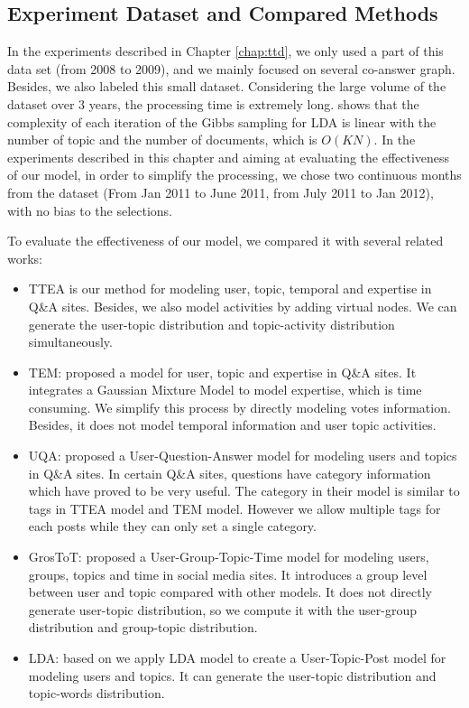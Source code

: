 {{{{{{{\subsection{Experiment Dataset and Compared Methods}
In the experiments described in Chapter \ref{chap:ttd}, we only used a part of this data set (from 2008 to 2009), and we mainly focused on several co-answer graph. Besides, we also labeled this small dataset.
Considering the large volume of the dataset over 3 years, the processing time is extremely long. \cite{chp7ldatimecomplexity} shows that the complexity of each iteration of the Gibbs sampling for LDA is linear with the number of topic and the number of documents, which is $O(KN)$.  
In the experiments described in this chapter and aiming at evaluating the effectiveness of our model, in order to simplify the processing, we chose two continuous months from the dataset (From Jan 2011 to June 2011, from July 2011 to Jan 2012), with no bias to the selections.

To evaluate the effectiveness of our model, we compared it with several related works:  
\begin{itemize}
\item{TTEA} is our method for modeling user, topic, temporal and expertise in Q\&A sites. Besides, we also model activities by adding virtual nodes. We can generate the user-topic distribution and topic-activity distribution simultaneously. 
\item{TEM}: \cite{yang2013cqarank} proposed a model for user, topic and expertise in Q\&A sites. It integrates a Gaussian Mixture Model to model expertise, which is time consuming. We simplify this process by directly modeling votes information. Besides, it does not model temporal information and user topic activities. 
\item{UQA}: \cite{guo2008tapping} proposed a User-Question-Answer model for modeling users and topics in Q\&A  sites. In certain Q\&A  sites, questions have category information which have proved to be very useful. The category in their model is similar to tags in TTEA model and TEM model. However we allow multiple tags for each posts while they can only set a single category.
\item{GrosToT}: \cite{hu2014user} proposed a User-Group-Topic-Time model for modeling users, groups, topics and time in social media sites. It introduces a group level between user and topic compared with other models. It does not directly generate user-topic distribution, so we compute it with the user-group distribution and group-topic distribution.%
\item{LDA}: based on \cite{blei2003latent} we apply LDA model to create a User-Topic-Post model for modeling users and topics. It can generate the user-topic distribution and topic-words distribution.


\end{itemize}}}}}}}}
